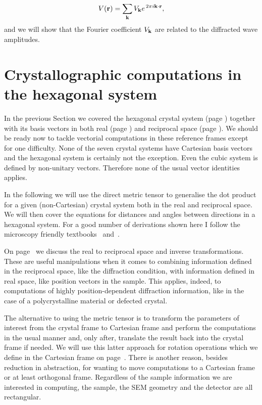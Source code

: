 \begin{equation}
V(\vb{r}) = \sum_{\vb{k}} V_{\vb{k}} e^{\,2 \pi i \vb{k}\cdot \vb{r}},
\end{equation}
and we will show that the Fourier coefficient $V_{\vb{k}}$ are related to the diffracted wave amplitudes.

\pagebreak
\section{Crystallographic computations in the hexagonal system}
\label{chap:real+recAlg}

In the previous Section we covered the hexagonal crystal system (page \pageref{Sect:spaceLattice}) together with its basis vectors in both real (page \pageref{sec:latMB}) and reciprocal space (page \pageref{sec:recMB}). We should be ready now to tackle vectorial computations in these reference frames except for one difficulty. None of the seven crystal systems have Cartesian basis vectors and the hexagonal system is certainly not the exception. Even the cubic system is defined by non-unitary vectors. Therefore none of the usual vector identities applies.

In the following we will use the direct metric tensor to generalise the dot product for a given (non-Cartesian) crystal system both in the real and reciprocal space. We will then cover the equations for distances and angles between directions in a hexagonal system. For a good number of derivations shown here I follow the microscopy friendly textbooks~\cite{MarcTEM03} and~\cite{SoM}.

On page~\pageref{subChap:RealRec} we discuss the real to reciprocal space and inverse transformations. These are useful manipulations when it comes to combining information defined in the reciprocal space, like the diffraction condition, with information defined in real space, like position vectors in the sample. This applies, indeed, to computations of highly position-dependent diffraction information, like in the case of a polycrystalline material or defected crystal.

The alternative to using the metric tensor is to transform the parameters of interest from the crystal frame to Cartesian frame and perform the computations in the usual manner and, only after, translate the result back into the crystal frame if needed. We will use this latter approach for rotation operations which we define in the Cartesian frame on page~\pageref{subchap:basicRot}. There is another reason, besides reduction in abstraction, for wanting to move computations to a Cartesian frame or at least orthogonal frame. Regardless of the sample information we are interested in computing, the sample, the SEM geometry and the detector are all rectangular.

